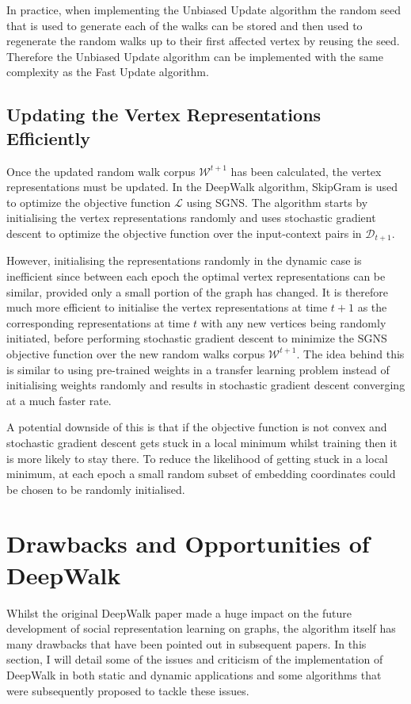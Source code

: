 \documentclass[a4paper]{article}
\newcommand{\D}{\mathcal D}
\newcommand{\W}{\mathcal W}
\begin{document}
In practice, when implementing the Unbiased Update algorithm the random seed
that is used to generate each of the walks can be stored and then used to
regenerate the random walks up to their first affected vertex by reusing the
seed. Therefore the Unbiased Update algorithm can be implemented with the same
complexity as the Fast Update algorithm.

\subsection{Updating the Vertex Representations Efficiently}
Once the updated random walk corpus $\W^{t+1}$ has been calculated, the vertex
representations must be updated. In the DeepWalk algorithm, SkipGram is used to
optimize the objective function $\mathcal{L}$ using SGNS.
The algorithm starts by initialising the vertex representations randomly and
uses stochastic gradient descent to optimize the objective function over the
input-context pairs in $\D_{t+1}$.

However, initialising the representations randomly in the dynamic case is
inefficient since between each epoch the optimal vertex representations can be similar, provided only a small portion of the graph has changed. It is therefore much more efficient to initialise the vertex
representations at time $t+1$ as the corresponding representations at time $t$
with any new vertices being randomly initiated, before performing stochastic gradient
descent to minimize the SGNS objective function over the new random walks corpus
$\W^{t+1}$. The idea behind this is similar to using pre-trained weights in a transfer
learning problem instead of initialising weights randomly and results in
stochastic gradient descent converging at a much faster rate.

A potential downside of this is that if the objective function is not convex and
stochastic gradient descent gets stuck in a local minimum whilst training then it
is more likely to stay there. To reduce the likelihood of getting stuck in a local
minimum, at each epoch a small random subset of embedding coordinates could be chosen to be randomly initialised.

\section{Drawbacks and Opportunities of DeepWalk}
Whilst the original DeepWalk paper made a huge impact on the future development
of social representation learning on graphs, the algorithm itself has many drawbacks that have been pointed out in subsequent papers. In this section, I will detail some of the issues and criticism of the implementation of
DeepWalk in both static and dynamic applications and some algorithms that were subsequently proposed to tackle these issues.\\
\end{document}
